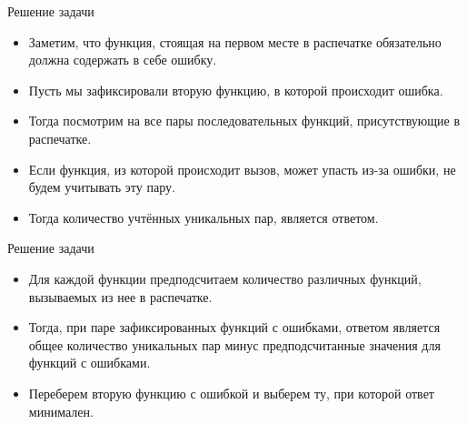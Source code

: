 \begin{frame}[t]{Решение задачи}
\begin{itemize}
    \item Заметим, что функция, стоящая на первом месте в распечатке обязательно должна содержать в себе ошибку.
    \item Пусть мы зафиксировали вторую функцию, в которой происходит ошибка.
    \item Тогда посмотрим на все пары последовательных функций, присутствующие в распечатке.
    \item Если функция, из которой происходит вызов, может упасть из-за ошибки, не будем учитывать эту пару.
    \item Тогда количество учтённых уникальных пар, является ответом.
\end{itemize}
\end{frame}

\begin{frame}[t]{Решение задачи}
\begin{itemize}
    \item Для каждой функции предподсчитаем количество различных функций, вызываемых из нее в распечатке.
    \item Тогда, при паре зафиксированных функций с ошибками, ответом является общее количество уникальных пар минус предподсчитанные значения для функций с ошибками.
    \item Переберем вторую функцию с ошибкой и выберем ту, при которой ответ минимален.
\end{itemize}
\end{frame}
